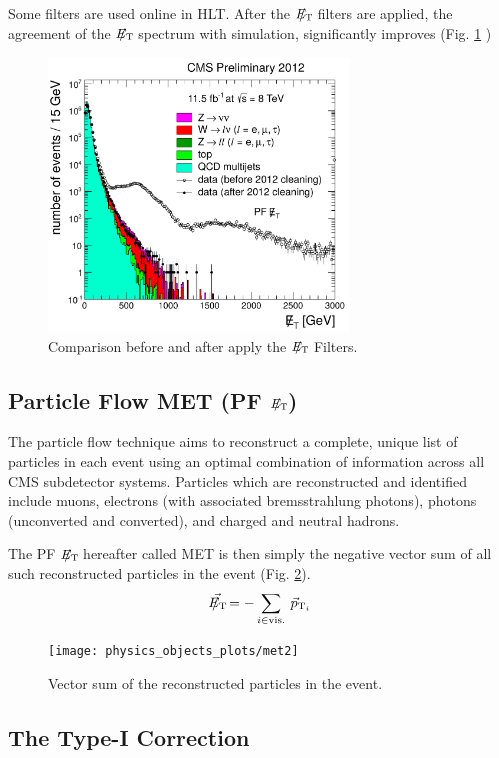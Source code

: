 Some filters are used online in HLT. After the $E_{\mathrm{T}}\hspace{-1.1em}/\kern0.45em$ filters are applied, the agreement of the $E_{\mathrm{T}}\hspace{-1.1em}/\kern0.45em$ spectrum
with simulation, significantly improves (Fig. \ref{figuremetmiss} )
\begin{figure}[H]
  \centering
\includegraphics[width=8cm]{physics_objects_plots/met_missrec}
\caption{Comparison before and after apply the $E_{\mathrm{T}}\hspace{-1.1em}/\kern0.45em$ Filters. \label{figuremetmiss}}
\end{figure}

\subsection{Particle Flow MET (PF $E_{\mathrm{T}}\hspace{-1.1em}/\kern0.45em$)}

The particle flow technique aims to reconstruct a complete, unique list of particles in each event using an optimal combination of information across all CMS subdetector systems. Particles which are
reconstructed and identified include muons, electrons (with associated bremsstrahlung photons), photons (unconverted and converted), and charged and neutral hadrons.

The PF $E_{\mathrm{T}}\hspace{-1.1em}/\kern0.45em$ hereafter called MET is then simply the negative vector sum of all such reconstructed particles in the event (Fig. \ref{figuremet2}).
\begin{eqnarray}
\vec{E_{\mathrm{T}}\hspace{-1.1em}/\kern0.45em} = - \sum_{i \in  \text{vis.}}\:\vec{p}_{\mathrm{T}_{i}} 
\end{eqnarray}

\begin{figure}[H]
  \centering
\texttt{[image: physics\_objects\_plots/met2]}
\caption{Vector sum of the reconstructed particles in the event. \label{figuremet2}}
\end{figure}

\subsection{The Type-I Correction}\label{typeI}

